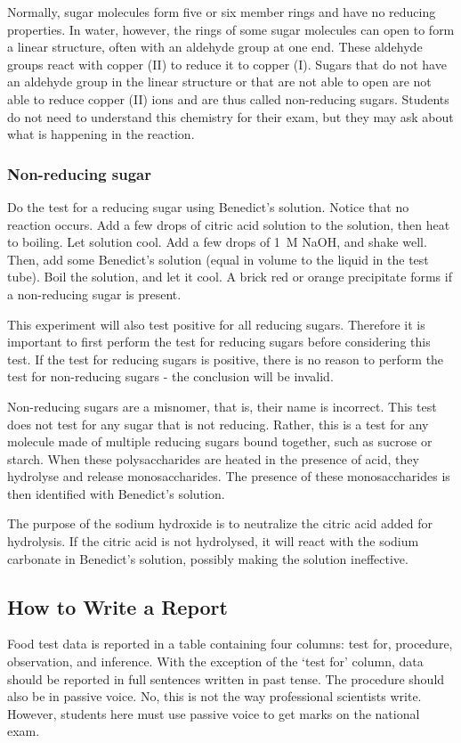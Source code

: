 \begin{itemize}
Normally, sugar molecules form five or six member rings and have no reducing properties. In water, however, the rings of some sugar molecules can open to form a linear structure, often with an aldehyde group at one end. These aldehyde groups react with copper (II) to reduce it to copper (I). Sugars that do not have an aldehyde group in the linear structure or that are not able to open are not able to reduce copper (II) ions and are thus called non-reducing sugars. Students do not need to understand this chemistry for their exam, but they may ask about what is happening in the reaction.

\subsubsection{Non-reducing sugar}
Do the test for a reducing sugar using Benedict's solution. Notice that no reaction occurs. Add a few drops of citric acid solution to the solution, then heat to boiling. Let solution cool. Add a few drops of 1~M NaOH, and shake well. Then, add some Benedict’s solution (equal in volume to the liquid in the test tube). Boil the solution, and let it cool. A brick red or orange precipitate forms if a non-reducing sugar is present.

This experiment will also test positive for all reducing sugars. Therefore it is important to first perform the test for reducing sugars before considering this test. If the test for reducing sugars is positive, there is no reason to perform the test for non-reducing sugars - the conclusion will be invalid.

Non-reducing sugars are a misnomer, that is, their name is incorrect. This test does not test for any sugar that is not reducing. Rather, this is a test for any molecule made of multiple reducing sugars bound together, such as sucrose or starch. When these polysaccharides are heated in the presence of acid, they hydrolyse and release monosaccharides. The presence of these monosaccharides is then identified with Benedict's solution.

The purpose of the sodium hydroxide is to neutralize the citric acid added for hydrolysis. If the citric acid is not hydrolysed, it will react with the sodium carbonate in Benedict's solution, possibly making the solution ineffective.

\subsection{How to Write a Report}
Food test data is reported in a table containing four columns: test for, procedure, observation, and inference. With the exception of the `test for’ column, data should be reported in full sentences written in past tense. The procedure should also be in passive voice. No, this is not the way professional scientists write. However, students here must use passive voice to get marks on the national exam.


\end{itemize}
